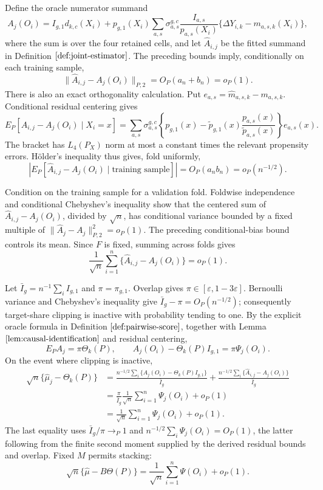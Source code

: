 Define the oracle numerator summand
\[
 A_j(O_i)=I_{g,1}d_{k,c}(X_i)
 +p_{g,1}(X_i)\sum_{a,s}\sigma_{a,s}^{g,c}
 \frac{I_{a,s}}{p_{a,s}(X_i)}
 \{\Delta Y_{i,k}-m_{a,s,k}(X_i)\},
\]
where the sum is over the four retained cells, and let \(\widehat A_{i,j}\) be the fitted summand in Definition \(\ref{def:joint-estimator}\). The preceding bounds imply, conditionally on each training sample,
\[
 \|\widehat A_{i,j}-A_j(O_i)\|_{P,2}=O_P(a_n+b_n)=o_P(1).
\]
There is also an exact orthogonality calculation. Put \(e_{a,s}=\widehat m_{a,s,k}-m_{a,s,k}\). Conditional residual centering gives
\[
 E_P[\widehat A_{i,j}-A_j(O_i)\mid X_i=x]
 =\sum_{a,s}\sigma_{a,s}^{g,c}
 \left\{p_{g,1}(x)-\widetilde p_{g,1}(x)
 \frac{p_{a,s}(x)}{\widetilde p_{a,s}(x)}\right\}e_{a,s}(x).
\]
The bracket has \(L_4(P_X)\) norm at most a constant times the relevant propensity errors. Hölder's inequality thus gives, fold uniformly,
\[
 \left|E_P[\widehat A_{i,j}-A_j(O_i)\mid\text{training sample}]\right|
 =O_P(a_nb_n)=o_P(n^{-1/2}).
\]

Condition on the training sample for a validation fold. Foldwise independence and conditional Chebyshev's inequality show that the centered sum of \(\widehat A_{i,j}-A_j(O_i)\), divided by \(\sqrt n\), has conditional variance bounded by a fixed multiple of \(\|\widehat A_j-A_j\|_{P,2}^2=o_P(1)\). The preceding conditional-bias bound controls its mean. Since \(F\) is fixed, summing across folds gives
\[
 \frac1{\sqrt n}\sum_{i=1}^n\{\widehat A_{i,j}-A_j(O_i)\}=o_P(1).
\]

Let \(\bar I_g=n^{-1}\sum_i I_{g,1}\) and \(\pi=\pi_{g,1}\). Overlap gives \(\pi\in[\varepsilon,1-3\varepsilon]\). Bernoulli variance and Chebyshev's inequality give \(\bar I_g-\pi=O_P(n^{-1/2})\); consequently target-share clipping is inactive with probability tending to one. By the explicit oracle formula in Definition \(\ref{def:pairwise-score}\), together with Lemma \(\ref{lem:causal-identification}\) and residual centering,
\[
 E_PA_j=\pi\Theta_k(P),
 \qquad
 A_j(O_i)-\Theta_k(P)I_{g,1}=\pi\Psi_j(O_i).
\]
On the event where clipping is inactive,
\[
\begin{aligned}
 \sqrt n\{\widehat\mu_j-\Theta_k(P)\}
 &=\frac{n^{-1/2}\sum_i\{A_j(O_i)-\Theta_k(P)I_{g,1}\}}{\bar I_g}
   +\frac{n^{-1/2}\sum_i\{\widehat A_{i,j}-A_j(O_i)\}}{\bar I_g}\\
 &=\frac{\pi}{\bar I_g}\frac1{\sqrt n}\sum_{i=1}^n\Psi_j(O_i)+o_P(1)\\
 &=\frac1{\sqrt n}\sum_{i=1}^n\Psi_j(O_i)+o_P(1).
\end{aligned}
\]
The last equality uses \(\bar I_g/\pi\to_P1\) and \(n^{-1/2}\sum_i\Psi_j(O_i)=O_P(1)\), the latter following from the finite second moment supplied by the derived residual bounds and overlap. Fixed \(M\) permits stacking:
\[
 \sqrt n\{\widehat\mu-B\Theta(P)\}
 =\frac1{\sqrt n}\sum_{i=1}^n\Psi(O_i)+o_P(1).
\]

